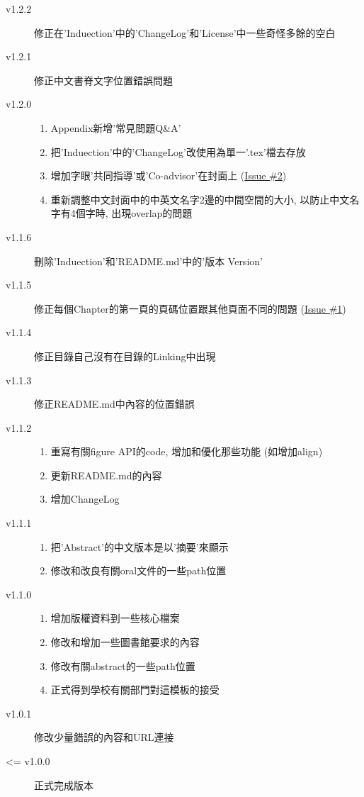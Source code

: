 \begin{description}
  \item[v1.2.2] 修正在'Induection'中的'ChangeLog'和'License'中一些奇怪多餘的空白

  \item[v1.2.1] 修正中文書脊文字位置錯誤問題

  \item[v1.2.0] \hfill
    \begin{enumerate}
      \item Appendix新增'常見問題Q\&A'
      \item 把'Induection'中的'ChangeLog'改使用為單一'.tex'檔去存放
      \item 增加字眼'共同指導'或'Co-advisor'在封面上 (\href{https://github.com/wengan-li/ncku-thesis-template-latex/issues/2}{Issue \#2})
      \item 重新調整中文封面中的中英文名字2邊的中間空間的大小, 以防止中文名字有4個字時, 出現overlap的問題
    \end{enumerate}

  \item[v1.1.6] 刪除'Induection'和'README.md'中的'版本 Version'

  \item[v1.1.5] 修正每個Chapter的第一頁的頁碼位置跟其他頁面不同的問題 (\href{https://github.com/wengan-li/ncku-thesis-template-latex/issues/1}{Issue \#1})

  \item[v1.1.4] 修正目錄自己沒有在目錄的Linking中出現

  \item[v1.1.3] 修正README.md中內容的位置錯誤

  \item[v1.1.2] \hfill
    \begin{enumerate}
      \item 重寫有關figure API的code, 增加和優化那些功能 (如增加align)
      \item 更新README.md的內容
      \item 增加ChangeLog
    \end{enumerate}

  \item[v1.1.1] \hfill
    \begin{enumerate}
      \item 把'Abstract'的中文版本是以'摘要'來顯示
      \item 修改和改良有關oral文件的一些path位置
    \end{enumerate}

  \item[v1.1.0] \hfill
    \begin{enumerate}
      \item 增加版權資料到一些核心檔案
      \item 修改和增加一些圖書館要求的內容
      \item 修改有關abstract的一些path位置
      \item 正式得到學校有關部門對這模板的接受
    \end{enumerate}

  \item[v1.0.1] 修改少量錯誤的內容和URL連接

  \item[<= v1.0.0] 正式完成版本
\end{description}

